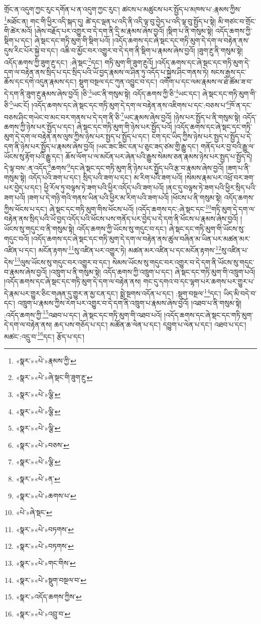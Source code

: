 གྲོང་ན་འདུག་ཀྱང་རུང་དགོན་པ་ན་འདུག་ཀྱང་རུང་། ཚངས་པ་མཚུངས་པར་སྤྱོད་པ་མཁས་པ་:རྣམས་ཀྱིས་\footnote{«སྣར་»«པེ་»རྣམས་ཀྱི་}མཐོང་ན། གང་གི་ཕྱིར་འདི་སྐད་དུ། ཚེ་དང་ལྡན་པ་འདི་ནི་འདི་ལྟ་བུ་བྱེད་པ་འདི་ལྟ་བུ་སྤྱོད་པ་སྟེ། མི་གཙང་བ་གྲོང་གི་ཚེར་མའོ། །ཞེས་བརྗོད་པར་འགྱུར་བ་དེ་དག་ནི་དྲི་མ་རྣམས་ཞེས་བྱའོ། །སྡིག་པ་ནི་གསུམ་སྟེ། འདོད་ཆགས་ཀྱི་སྡིག་པ་དང་། ཞེ་སྡང་དང་གཏི་མུག་གི་སྡིག་པའོ། །འདོད་ཆགས་དང་ཞེ་སྡང་དང་གཏི་མུག་དེ་དག་ལ་བརྟེན་ནས་དུས་རིང་པོར་སྐྱེ་བ་དང་། འཆི་བ་མྱོང་བར་འགྱུར་བ་དེ་དག་ནི་སྡིག་པ་རྣམས་ཞེས་བྱའོ། །ཟུག་རྔུ་ནི་གསུམ་སྟེ། འདོད་ཆགས་ཀྱི་ཟུག་རྔུ་དང་། :ཞེ་སྡང་\footnote{«སྣར་»«པེ་»ཞེ་སྡང་གི་ཟུག་རྔུ་}དང་། གཏི་མུག་གི་ཟུག་རྔུའོ། །འདོད་ཆགས་དང་ཞེ་སྡང་དང་གཏི་མུག་དེ་དག་ལ་བརྟེན་ནས་སྲིད་པ་དང་སྲིད་པའི་ཡོ་བྱད་རྣམས་ལ་ཤིན་ཏུ་འདོད་པ་སྐྱེས་ཤིང་གནས་ཏེ། སངས་རྒྱས་དང་ཆོས་དང་དགེ་འདུན་རྣམས་དང་། སྡུག་བསྔལ་དང་ཀུན་འབྱུང་བ་དང་། འགོག་པ་དང་ལམ་རྣམས་ལ་ཐེ་ཚོམ་ཟ་བ་དེ་དག་ནི་ཟུག་རྔུ་རྣམས་ཞེས་བྱའོ། །ཅི་\footnote{«སྣར་»«པེ་»ལྕི་}ཡང་ནི་གསུམ་སྟེ། འདོད་ཆགས་ཀྱི་ཅི་\footnote{«སྣར་»«པེ་»ལྕི་}ཡང་དང་། ཞེ་སྡང་དང་གཏི་མུག་གི་ཅི་\footnote{«སྣར་»«པེ་»ལྕི་}ཡང་ངོ། །འདོད་ཆགས་དང་ཞེ་སྡང་དང་གཏི་མུག་དེ་དག་ལ་བརྟེན་ནས་འཇིགས་པ་དང་:བཅས་པ་\footnote{«སྣར་»«པེ་»བཅས་}ཁོ་ན་དང་བཅས་ཤིང་གཡེང་བ་མང་བར་གནས་པ་དེ་དག་ནི་ཅི་\footnote{«སྣར་»«པེ་»ལྕི་}ཡང་རྣམས་ཞེས་བྱའོ། །ཉེས་པར་སྤྱོད་པ་ནི་གསུམ་སྟེ། འདོད་ཆགས་ཀྱི་ཉེས་པར་སྤྱོད་པ་དང་། ཞེ་སྡང་དང་གཏི་མུག་གི་ཉེས་པར་སྤྱོད་པའོ། །འདོད་ཆགས་དང་ཞེ་སྡང་དང་གཏི་མུག་དེ་དག་ལ་བརྟེན་ནས་ལུས་ཀྱིས་ཉེས་པར་སྤྱད་པ་སྤྱོད་པ་དང་། ངག་དང་ཡིད་ཀྱིས་ཉེས་པར་སྤྱད་པ་སྤྱོད་པ་དེ་དག་ནི་ཉེས་པར་སྤྱོད་པ་རྣམས་ཞེས་བྱའོ། །ཡང་ཟང་ཟིང་ངན་པ་ཅུང་ཟད་ཙམ་གྱི་རྒྱུ་དང་། གནོད་པར་བྱ་བའི་རྒྱུ་ལ་ཡོངས་སུ་རྟོག་པའི་རྒྱུ་དང་། ཆོས་ལོག་པ་ལ་མངོན་པར་ཞེན་པའི་རྒྱུས་སེམས་ཅན་རྣམས་ཉེས་པར་སྤྱད་པ་སྤྱོད་དེ། དེ་ལྟ་བས་:ན་འདོད་\footnote{«སྣར་»«པེ་»ན་}ཆགས་\footnote{«སྣར་»«པེ་»ཆགས་པ་}དང་ཞེ་སྡང་དང་གཏི་མུག་ནི་ཉེས་པར་སྤྱོད་པའི་རྩ་བ་རྣམས་ཞེས་བྱའོ། །ཟག་པ་ནི་གསུམ་སྟེ། འདོད་པའི་ཟག་པ་དང་། སྲིད་པའི་ཟག་པ་དང་། མ་རིག་པའི་ཟག་པའོ། །སེམས་རྣམ་པར་འཕྲོ་བར་ཟག་པར་བྱེད་པ་དང་། ཕྱི་རོལ་ཏུ་བལྟས་ཏེ་ཟག་པའི་ཕྱིར་འདོད་པའི་ཟག་པའོ། །ནང་དུ་བལྟས་ཏེ་ཟག་པའི་ཕྱིར་སྲིད་པའི་ཟག་པའོ། །ཟག་པ་དེ་གཉི་གའི་གནས་ཡིན་པའི་ཕྱིར་མ་རིག་པའི་ཟག་པའོ། །ཕོངས་པ་ནི་གསུམ་སྟེ། འདོད་ཆགས་ཀྱིས་ཕོངས་པ་དང་། ཞེ་སྡང་དང་གཏི་མུག་གིས་ཕོངས་པའོ། །འདོད་ཆགས་དང་:ཞེ་སྡང་དང་\footnote{«པེ་»ཞེ་སྡང་}གཏི་མུག་དེ་དག་ལ་བརྟེན་ནས་སྲིད་པའི་ཡོ་བྱད་འདོད་པའི་ཕོངས་པས་གནོད་པར་བྱེད་པ་དེ་དག་ནི་ཕོངས་པ་རྣམས་ཞེས་བྱའོ། །ཡོངས་སུ་གདུང་བ་ནི་གསུམ་སྟེ། འདོད་ཆགས་ཀྱི་ཡོངས་སུ་གདུང་བ་དང་། ཞེ་སྡང་དང་གཏི་མུག་གི་ཡོངས་སུ་གདུང་བའོ། །འདོད་ཆགས་དང་ཞེ་སྡང་དང་གཏི་མུག་དེ་དག་ལ་བརྟེན་ནས་ཚུལ་བཞིན་མ་ཡིན་པར་མཚན་མར་འཛིན་པ་དང་། མངོན་རྟགས་\footnote{«སྣར་»«པེ་»བཏགས་}སུ་འཛིན་པར་འགྱུར་ཏེ། མཚན་མར་འཛིན་པ་དང་མངོན་རྟགས་\footnote{«སྣར་»«པེ་»བཏགས་}སུ་འཛིན་པ་དེས་\footnote{«སྣར་»«པེ་»གང་གིས་}ལུས་ཡོངས་སུ་གདུང་བར་འགྱུར་བ་དང་། སེམས་ཡོངས་སུ་གདུང་བར་འགྱུར་བ་དེ་དག་ནི་ཡོངས་སུ་གདུང་བ་རྣམས་ཞེས་བྱའོ། །འཁྲུག་པ་ནི་གསུམ་སྟེ། འདོད་ཆགས་ཀྱི་འཁྲུག་པ་དང་། ཞེ་སྡང་དང་གཏི་མུག་གི་འཁྲུག་པའོ། །འདོད་ཆགས་དང་ཞེ་སྡང་དང་གཏི་མུག་དེ་དག་ལ་བརྟེན་ནས། གང་དུ་དགའ་བ་དང་ལྷག་པར་ཆགས་པར་གྱུར་པ་དེ་རྣམ་པར་གྱུར་ཅིང་གཞན་དུ་གྱུར་ན་མྱ་ངན་དང་། སྨྲེ་སྔགས་འདོན་པ་དང་། :སྡུག་བསྔལ་\footnote{«སྣར་»«པེ་»སྡུག་བསྔལ་བ་}དང་། ཡིད་མི་བདེ་བ་དང་། འཁྲུག་པ་རྣམས་ཀྱིས་རེག་པར་འགྱུར་བ་དེ་དག་ནི་འཁྲུག་པ་རྣམས་ཞེས་བྱའོ། །འཐབ་པ་ནི་གསུམ་སྟེ། :འདོད་ཆགས་ཀྱི་\footnote{«སྣར་»འདོད་ཆགས་ཀྱིས་}འཐབ་པ་དང་། ཞེ་སྡང་དང་གཏི་མུག་གི་འཐབ་པའོ། །འདོད་ཆགས་དང་ཞེ་སྡང་དང་གཏི་མུག་དེ་དག་ལ་བརྟེན་ནས། ཆད་པས་གཅོད་པ་དང་། མཚོན་ཆ་ལེན་པ་དང་། དབྱུག་པ་ལེན་པ་དང་། འཐབ་པ་དང་། མཚང་:འདྲུ་བ་\footnote{«སྣར་»«པེ་»འབྲུ་བ་}དང་། རྩོད་པ་དང་། 